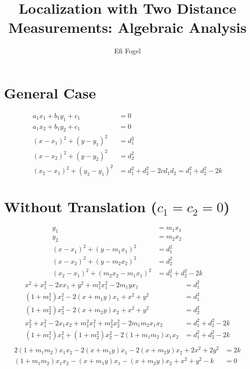 \documentclass[11pt]{article}
\title{Localization with Two Distance Measurements: Algebraic Analysis}
\date{}
\author{Efi Fogel}
\begin{document}
\maketitle



\section{General Case}
\begin{align*}
  a_1 x_1 + b_1 y_1 + c_1 &= 0\\
  a_1 x_2 + b_1 y_2 + c_1 &= 0\\
  (x - x_1)^2 + (y - y_1)^2 &= d_1^2\\
  (x - x_2)^2 + (y - y_2)^2 &= d_2^2\\
  (x_2 - x_1)^2 + (y_2 - y_1)^2 &= d_1^2 + d_2^2 - 2 c d_1 d_2 = d_1^2 + d_2^2 - 2 k
\end{align*}
\section{Without Translation ($c_1 = c_2 = 0$)}
\begin{align*}
  y_1 & = m_1 x_1\\
  y_2 & = m_2 x_2\\
  (x - x_1)^2 + (y - m_1 x_1)^2 & = d_1^2\\
  (x - x_2)^2 + (y - m_2 x_2)^2 & = d_2^2\\
  (x_2 - x_1)^2 + (m_2 x_2 - m_1 x_1)^2 & = d_1^2 + d_2^2 - 2 k
\end{align*}
\begin{align*}
  x^2 + x_1^2 - 2 x x_1 + y^2 + m_1^2x_1^2 - 2 m_1 y x_1 &= d_1^2\\
  (1 + m_1^2) x_1^2 - 2 (x + m_1 y) x_1  + x^2 + y^2  &= d_1^2\\
  (1 + m_2^2) x_2^2 - 2 (x + m_2 y) x_2  + x^2 + y^2  &= d_2^2\\
  x_2^2 + x_1^2 - 2 x_1 x_2 + m_1^2 x_1^2 + m_2^2 x_2^2 - 2 m_1 m_2 x_1 x_2 &= d_1^2 + d_2^2 - 2 k\\
  (1 + m_1^2) x_1^2 + (1 + m_2^2) x_2^2 - 2 (1 + m_1 m_2) x_1 x_2 &= d_1^2 + d_2^2 - 2 k\\
\end{align*}
\begin{align*}
  2 (1 + m_1 m_2) x_1 x_2 - 2 (x + m_1 y) x_1 - 2 (x + m_2 y) x_2 + 2 x^2 + 2 y^2 &= 2 k\\
  (1 + m_1 m_2) x_1 x_2 - (x + m_1 y) x_1 - (x + m_2 y) x_2 + x^2 + y^2 - k &= 0\\
\end{align*}
\end{document}
